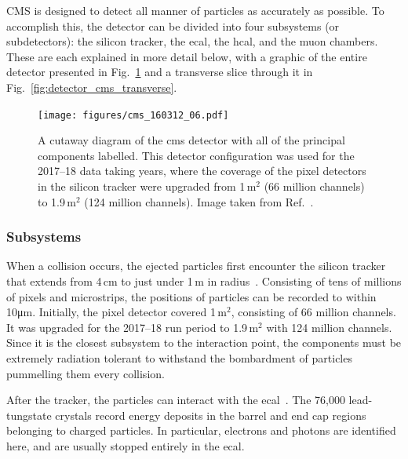 CMS is designed to detect all manner of particles as accurately as possible. To accomplish this, the detector can be divided into four subsystems (or subdetectors): the silicon tracker, the \acrfull{ecal}, the \acrfull{hcal}, and the muon chambers. These are each explained in more detail below, with a graphic of the entire detector presented in Fig.~\ref{fig:detector_cms_cutaway} and a transverse slice through it in Fig.~\ref{fig:detector_cms_transverse}.

\begin{figure}[htbp]
    \centering
    \texttt{[image: figures/cms\_160312\_06.pdf]}
    \caption[A cutaway diagram of the CMS detector with all of the principal components labelled. This detector configuration was used for the 2017--18 data taking years]{A cutaway diagram of the \acrshort{cms} detector with all of the principal components labelled. This detector configuration was used for the 2017--18 data taking years, where the coverage of the pixel detectors in the silicon tracker were upgraded from 1\,m$^2$ (66 million channels) to 1.9\,m$^2$ (124 million channels). Image taken from Ref.~.}
    \label{fig:detector_cms_cutaway}
\end{figure}




\subsubsection{Subsystems}
\label{subsubsec:cms_subsystems}

When a collision occurs, the ejected particles first encounter the silicon tracker that extends from 4\,cm to just under 1\,m in radius~\cite{Karimäki:368412,CERN-LHCC-2000-016}. Consisting of tens of millions of pixels and microstrips, the positions of particles can be recorded to within 10\si{\micro\metre}. Initially, the pixel detector covered 1\,m$^2$, consisting of 66 million channels. It was upgraded for the 2017--18 run period to 1.9\,m$^2$ with 124 million channels. Since it is the closest subsystem to the interaction point, the components must be extremely radiation tolerant to withstand the bombardment of particles pummelling them every collision. %

After the tracker, the particles can interact with the \acrshort{ecal}~\cite{CERN-LHCC-97-033,Bloch:581342}. The 76,000 lead-tungstate crystals record energy deposits in the barrel and end cap regions belonging to charged particles. In particular, electrons and photons are identified here, and are usually stopped entirely in the \acrshort{ecal}. %

